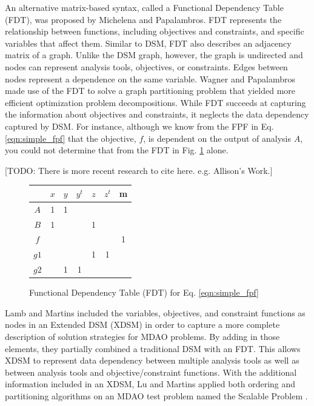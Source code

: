     An alternative matrix-based syntax, called a Functional Dependency Table (FDT), was proposed by Michelena and Papalambros. 
    FDT represents the relationship between functions, including objectives and constraints, and specific variables that affect 
    them\cite{Michelena1997}. Similar to DSM, FDT also describes an adjacency matrix of a graph. Unlike the DSM graph, 
    however, the graph is undirected and nodes can represent analysis tools, objectives, 
    or constraints. Edges between nodes represent a dependence on the same 
    variable. Wagner and Papalambros made use of the FDT to solve a graph partitioning problem that yielded 
    more efficient optimization problem decompositions\cite{Wagner1993}. While FDT succeeds at capturing the 
    information about objectives and constraints, it neglects the data dependency captured by DSM. For instance, 
    although we know from the FPF in Eq. \ref{eqn:simple_fpf} that the objective, $f$, is dependent on the 
    output of analysis $A$, you could not determine that from the FDT in Fig. \ref{fig:FDT_simple} alone. 
    
    [TODO: There is more recent research to cite here. e.g. Allison's Work.]

    \begin{figure}
        \begin{center}
        \begin{tabular}{|c|c|c|c|c|c|c|}
            \hline
                 & $x$ & $y$ & $y^t$ & $z$ & $z^t$ & m \\ \hline
            $A$  & 1  & 1    &       &     &       &   \\ \hline
            $B$  & 1  &      &       & 1   &       &   \\ \hline
            $f$  &    &      &       &     &       & 1 \\ \hline
            $g1$ &    &      &       & 1   & 1     &   \\ \hline
            $g2$ &    & 1    & 1     &     &       &   \\
            \hline
        \end{tabular}
        \caption{Functional Dependency Table (FDT) for Eq. \ref{eqn:simple_fpf} \label{fig:FDT_simple}}
        \end{center}
    \end{figure}

    Lamb and Martins included the variables, objectives, and constraint functions as nodes in an Extended 
    DSM (XDSM) in order to capture a more complete description of solution strategies for MDAO problems\cite{Lambe2012}. By adding in those 
    elements, they partially combined a traditional DSM with an FDT. 
    This allows XDSM to represent data dependency between multiple analysis tools as well as between analysis tools and
    objective/constraint functions. With the additional information included in an XDSM, Lu and Martins applied both ordering and partitioning 
    algorithms on an MDAO test problem named the Scalable Problem \cite{Lu2012}. 

